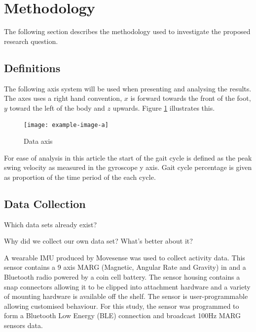 \documentclass[sensors,article,submit,moreauthors,pdftex]{Definitions/mdpi}
\begin{document}

\section{Methodology}
The following section describes the methodology used to investigate the proposed research question.
\subsection{Definitions}
The following axis system will be used when presenting and analysing the results. The axes uses a right hand convention, $x$ is forward towards the front of the foot, $y$ toward the left of the body and $z$ upwards. Figure \ref{fig:data_axis} illustrates this.

\begin{figure}[!htb]
    \centering
    \texttt{[image: example-image-a]}
    \caption{Data axis}
    \label{fig:data_axis}
\end{figure}

For ease of analysis in this article the start of the gait cycle is defined as the peak swing velocity as measured in the gyroscope y axis. Gait cycle percentage is given as proportion of the time period of the each cycle.
\subsection{Data Collection}
Which data sets already exist? 

Why did we collect our own data set? What's better about it?


A wearable IMU produced by Movesense was used to collect activity data. This sensor contains a 9 axis MARG (Magnetic, Angular Rate and Gravity) in and a Bluetooth radio powered by a coin cell battery. The sensor housing contains a snap connectors allowing it to be clipped into attachment hardware and a variety of mounting hardware is available off the shelf. The sensor is user-programmable allowing customised behaviour. For this study, the sensor was programmed to form a Bluetooth Low Energy (BLE) connection and broadcast 100Hz MARG sensors data. %
\end{document}
